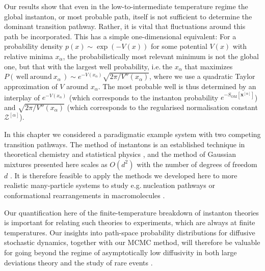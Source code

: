 Our results show that even in the low-to-intermediate temperature
regime the global instanton, or most probable path, itself is not
sufficient to determine the dominant transition pathway. Rather, it
is vital that fluctuations around this path be incorporated. This
has a simple one-dimensional equivalent: For a probability density
$p(x)\sim\exp(-V(x))$ for some potential $V(x)$ with relative
minima $x_{\alpha}$, the probabilistically most relevant minimum
is not the global one, but that with the largest well probability,
i.e.$~$the $x_{\alpha}$ that maximizes $P(\,\mathrm{well~around~}x_{\alpha}\,)\sim e^{-V(x_{\alpha})}\sqrt{{2\pi}/{V''(x_{\alpha})}}$,
where we use a quadratic Taylor approximation of $V$ around $x_{\alpha}$.
The most probable well is thus determined by an interplay of $e^{-V(x_{\alpha})}$
(which corresponds to the instanton probability $e^{-S_{\text{OM}}[\mathbf{x}^{[\alpha]}]}$)
and $\sqrt{{2\pi}/{V''(x_{\alpha})}}$ (which corresponds to the regularised
normalisation constant $\mathcal{Z}^{[\alpha]}$).

In this chapter we considered a paradigmatic example system with
two competing transition pathways. The method of instantons is an
established technique in theoretical chemistry and statistical physics
\citep{eMinimumActionMethod2004,e_string_2002,grafke_instanton_2015,grafke_numerical_2019,schorleppGelFandYaglomType2021,dematteis_experimental_2019,ferreApproximateOptimalControls2021,kikuchiRitzMethodTransition2020,heymannGeometricMinimumAction2008},
and the method of Gaussian mixtures presented here scales as $O(d^{2})$
with the number of degrees of freedom $d$ \citep{note:SI}. It is
therefore feasible to apply the methods we developed here to more
realistic many-particle systems to study e.g.$~$nucleation pathways
\citep{e_string_2002,lutskoHowCrystalsForm2019,rein_ten_wolde_numerical_1996}
or conformational rearrangements in macromolecules \citep{ren_transition_2005,fujisakiOnsagerMachlupActionbased2010,fujisakiMultiscaleEnhancedPath2013,gartner_modeling_2019}.

Our quantification here of the finite-temperature breakdown of instanton
theories is important for relating such theories to experiments, which
are always at finite temperatures. Our insights into path-space probability
distributions for diffusive stochastic dynamics, together with our
MCMC method, will therefore be valuable for going beyond the regime
of asymptotically low diffusivity in both large deviations theory
\citep{ventselSMALLRANDOMPERTURBATIONS1970,vanden-eijndenGeometricMinimumAction2008,eMinimumActionMethod2004,gartnerModelingSimulationsPolymers2019}
and the study of rare events \citep{grafkeSharpAsymptoticEstimates2021}.









